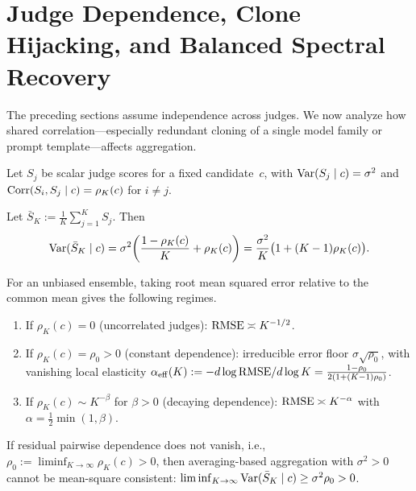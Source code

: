 \section{Judge Dependence, Clone Hijacking, and Balanced Spectral Recovery}
\label{sec:dependence}

The preceding sections assume independence across judges. We now analyze how
shared correlation---especially redundant cloning of a single model family or
prompt template---affects aggregation.

\begin{definition}
\label{def:equicorrelated}
Let $S_j$ be scalar judge scores for a fixed candidate~$c$, with
$\mathrm{Var}(S_j \mid c) = \sigma^2$ and
$\mathrm{Corr}(S_i, S_j \mid c) = \rho_K(c)$ for $i \neq j$.
\end{definition}

\begin{proposition}
\label{prop:variance-floor}
Let $\bar{S}_K := \frac{1}{K}\sum_{j=1}^K S_j$. Then
\begin{equation}
\label{eq:variance-formula}
\mathrm{Var}(\bar{S}_K \mid c)
= \sigma^2\!\left(\frac{1 - \rho_K(c)}{K} + \rho_K(c)\right)
= \frac{\sigma^2}{K}\big(1 + (K-1)\rho_K(c)\big).
\end{equation}
\end{proposition}

\begin{corollary}
\label{cor:scaling-regimes}
For an unbiased ensemble, taking root mean squared error relative to the common mean gives the following regimes.
\begin{enumerate}[leftmargin=*,itemsep=2pt]
\item If $\rho_K(c) = 0$ (uncorrelated judges):
  $\mathrm{RMSE} \asymp K^{-1/2}$.
\item If $\rho_K(c) = \rho_0 > 0$ (constant dependence):
  irreducible error floor $\sigma\sqrt{\rho_0}$, with vanishing local elasticity
  $\alpha_{\mathrm{eff}}(K) := -d\log\mathrm{RMSE} / d\log K = \frac{1-\rho_0}{2(1+(K-1)\rho_0)}$.
\item If $\rho_K(c) \sim K^{-\beta}$ for $\beta > 0$ (decaying dependence):
  $\mathrm{RMSE} \asymp K^{-\alpha}$ with $\alpha = \tfrac{1}{2}\min(1,\beta)$.
\end{enumerate}
\end{corollary}

\begin{theorem}
\label{thm:impossibility-dependence}
If residual pairwise dependence does not vanish, i.e.,
$\rho_0:=\liminf_{K \to \infty} \rho_K(c) > 0$, then averaging-based aggregation
with $\sigma^2>0$ cannot be mean-square consistent: $\liminf_{K \to \infty} \mathrm{Var}(\bar{S}_K \mid c) \ge \sigma^2\rho_0 > 0$.
\end{theorem}

